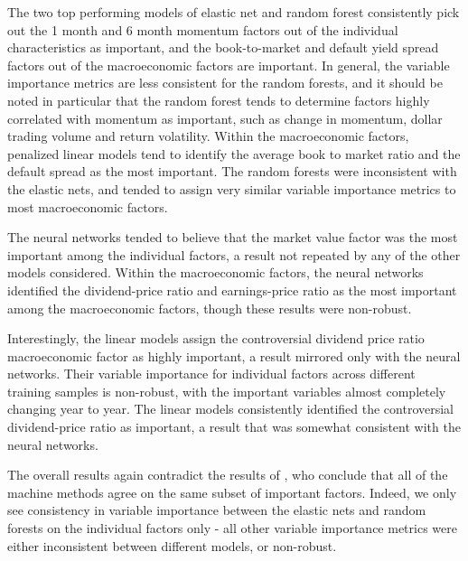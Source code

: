\documentclass{article}
\begin{document}
The two top performing models of elastic net and random forest consistently pick out the 1 month and 6 month momentum factors out of the individual characteristics as important, and the book-to-market and default yield spread factors out of the macroeconomic factors are important. In general, the variable importance metrics are less consistent for the random forests, and it should be noted in particular that the random forest tends to determine factors highly correlated with momentum as important, such as change in momentum, dollar trading volume and return volatility. Within the macroeconomic factors, penalized linear models tend to identify the average book to market ratio and the default spread as the most important. The random forests were inconsistent with the elastic nets, and tended to assign very similar variable importance metrics to most macroeconomic factors.

The neural networks tended to believe that the market value factor was the most important among the individual factors, a result not repeated by any of the other models considered. Within the macroeconomic factors, the neural networks identified the dividend-price ratio and earnings-price ratio as the most important among the macroeconomic factors, though these results were non-robust.

Interestingly, the linear models assign the controversial dividend price ratio macroeconomic factor as highly important, a result mirrored only with the neural networks. Their variable importance for individual factors across different training samples is non-robust, with the important variables almost completely changing year to year. The linear models consistently identified the controversial dividend-price ratio as important, a result that was somewhat consistent with the neural networks. 

The overall results again contradict the results of \cite{gu_empirical_2018}, who conclude that all of the machine methods agree on the same subset of important factors. Indeed, we only see consistency in variable importance between the elastic nets and random forests on the individual factors only - all other variable importance metrics were either inconsistent between different models, or non-robust.

\end{document}
